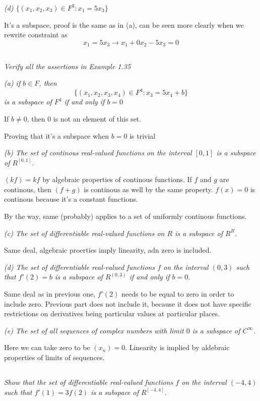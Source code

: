 \documentclass[11pt,oneside,titlepage]{book}
\begin{document}
\textit{(d) $\{(x_1, x_2, x_3) \in F^3: x_1  = 5x_3\}$}

It's a subspace, proof is the same as in (a), can be seen more clearly when we
rewrite constraint as
$$x_1 = 5x_3 \to x_1 + 0x_2 -5x_3 = 0$$

\subsection{}
\textit{Verify all the assertions in Example 1.35}

\textit{(a) if $b \in F$, then}
$$\{(x_1, x_2, x_3, x_4) \in F^4: x_3 = 5x_4 + b\}$$
\textit{is a subspace of $F^4$ if and only if $b = 0$}

If $b \neq 0$, then $0$ is not an element of this set.

Proving that it's a subspace when $b = 0$ is trivial

\textit{(b) The set of continous real-valued functions on the interval $[0, 1]$
  is a subspace of $R^{[0, 1]}$.}

$(kf) = kf$ by algebraic properties of continous functions.
If $f$ and $g$ are continous, then $(f + g)$ is continous as well by the same
property.
$f(x) = 0$ is continous because it's a constant functions.

By the way, same (probably) applies to a set of uniformly continous functions.

\textit{(c) The set of differentiable real-valued functions on $R$ is a
  subspace of $R^R$.}

Same deal, algebraic proerties imply linearity, adn zero is included.

\textit{(d) The set of differentiable real-valued functions $f$ on the
  interval $(0, 3)$ such that $f'(2) = b$ is a subspace of $R^{(0, 3)}$
  if and only if $b = 0$.}

Same deal as in previous one, $f'(2)$ needs to be equal to zero in order
to include zero. Previous part does not include it, because it does not
have specific restrictions on derivatives being particular values at particular places.

\textit{(e) The set of all sequences of complex numbers with limit $0$ is a
  subspace of $C^{\infty}$.}

Here we can take zero to be $(x_n) = 0$. Linearity is implied by aldebraic
properties of limits of sequences.

\subsection{}
\textit{Show that the set of differentiable real-valued functions $f$ on the
  interval $(-4, 4)$ such that $f'(1) = 3f(2)$ is a subspace of $R^{[-4, 4]}$.}
\end{document}
